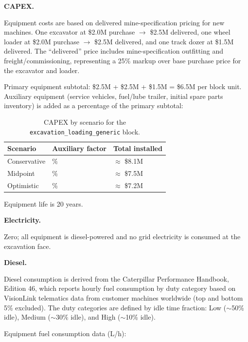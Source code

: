 \medskip
\noindent\textbf{CAPEX.}\quad

Equipment costs are based on delivered mine-specification pricing for new machines. One excavator at \$2.0M purchase $\rightarrow$ \$2.5M delivered, one wheel loader at \$2.0M purchase $\rightarrow$ \$2.5M delivered, and one track dozer at \$1.5M delivered. The ``delivered'' price includes mine-specification outfitting and freight/commissioning, representing a 25\% markup over base purchase price for the excavator and loader.

Primary equipment subtotal: \$2.5M + \$2.5M + \$1.5M = \$6.5M per block unit. Auxiliary equipment (service vehicles, fuel/lube trailer, initial spare parts inventory) is added as a percentage of the primary subtotal:

\begin{table}[h!]
\caption{CAPEX by scenario for the \texttt{excavation\_loading\_generic} block.}
\centering
\begin{tabular}{>{\raggedright\arraybackslash}p{5.2cm}
				>{\raggedright\arraybackslash}p{4cm}
				>{\raggedright\arraybackslash}p{4.5cm}}
\toprule
\textbf{Scenario} & \textbf{Auxiliary factor} & \textbf{Total installed} \\
\midrule
Conservative & 25\% & $\approx$ \$8.1M \\
Midpoint & 15\% &  $\approx$ \$7.5M \\
Optimistic & 10\% &  $\approx$ \$7.2M \\
\bottomrule
\end{tabular}
\end{table}

\noindent Equipment life is 20 years.

\medskip
\noindent\textbf{Electricity.}\quad

Zero; all equipment is diesel-powered and no grid electricity is consumed at the excavation face.

\medskip
\noindent\textbf{Diesel.}\quad

Diesel consumption is derived from the Caterpillar Performance Handbook, Edition 46, which reports hourly fuel consumption by duty category based on VisionLink telematics data from customer machines worldwide (top and bottom 5\% excluded). The duty categories are defined by idle time fraction: Low ($\sim$50\% idle), Medium ($\sim$30\% idle), and High ($\sim$10\% idle).

Equipment fuel consumption data (L/h):

